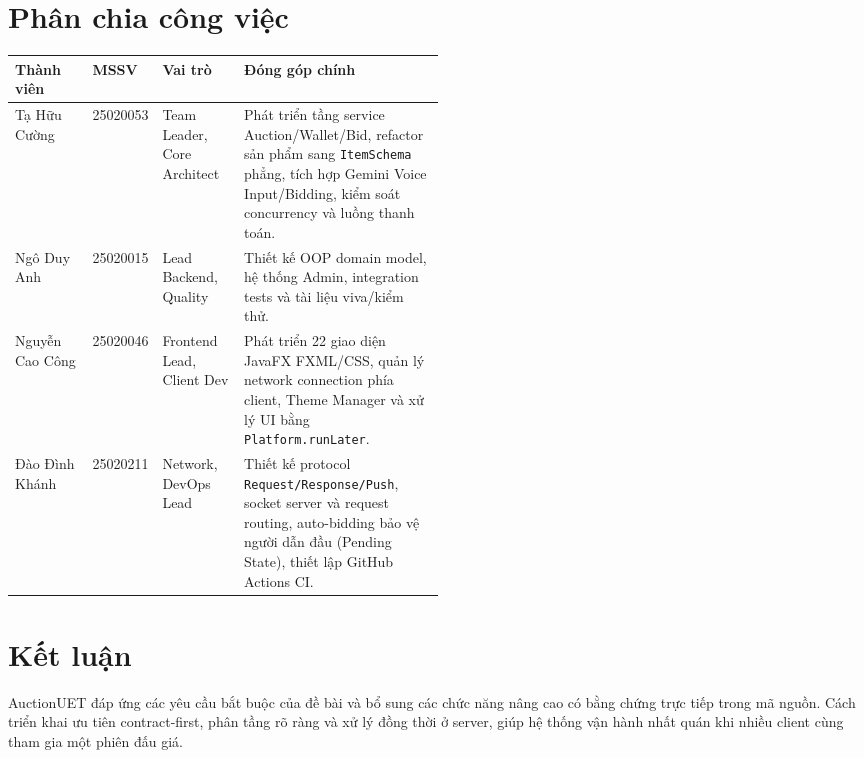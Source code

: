 \documentclass[10pt,a4paper]{article}
\begin{document}
\vspace{2pt}
\section{Phân chia công việc}
\small
\begin{tabularx}{\linewidth}{p{0.18\linewidth} p{0.13\linewidth} p{0.19\linewidth} Y}
\toprule
Thành viên & MSSV & Vai trò & Đóng góp chính \\
\midrule
Tạ Hữu Cường & 25020053 & Team Leader, Core Architect & Phát triển tầng service Auction/Wallet/Bid, refactor sản phẩm sang \texttt{ItemSchema} phẳng, tích hợp Gemini Voice Input/Bidding, kiểm soát concurrency và luồng thanh toán. \\
Ngô Duy Anh & 25020015 & Lead Backend, Quality & Thiết kế OOP domain model, hệ thống Admin, integration tests và tài liệu viva/kiểm thử. \\
Nguyễn Cao Công & 25020046 & Frontend Lead, Client Dev & Phát triển 22 giao diện JavaFX FXML/CSS, quản lý network connection phía client, Theme Manager và xử lý UI bằng \texttt{Platform.runLater}. \\
Đào Đình Khánh & 25020211 & Network, DevOps Lead & Thiết kế protocol \texttt{Request/Response/Push}, socket server và request routing, auto-bidding bảo vệ người dẫn đầu (Pending State), thiết lập GitHub Actions CI. \\
\bottomrule
\end{tabularx}
\normalsize

\section{Kết luận}
AuctionUET đáp ứng các yêu cầu bắt buộc của đề bài và bổ sung các chức năng nâng cao có bằng chứng trực tiếp trong mã nguồn. Cách triển khai ưu tiên contract-first, phân tầng rõ ràng và xử lý đồng thời ở server, giúp hệ thống vận hành nhất quán khi nhiều client cùng tham gia một phiên đấu giá.
\end{document}
